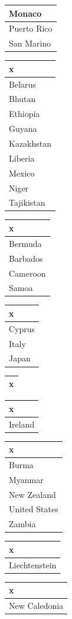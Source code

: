 \documentclass[]{article}
\begin{document}
\begin{table}
\begin{tabular}[t]{l}
\hline
Monaco\\
\hline
Puerto Rico\\
\hline
San Marino\\
\hline
\end{tabular}
\centering
\begin{tabular}[t]{l}
\hline
x\\
\hline
Belarus\\
\hline
Bhutan\\
\hline
Ethiopia\\
\hline
Guyana\\
\hline
Kazakhstan\\
\hline
Liberia\\
\hline
Mexico\\
\hline
Niger\\
\hline
Tajikistan\\
\hline
\end{tabular}
\centering
\begin{tabular}[t]{l}
\hline
x\\
\hline
Bermuda\\
\hline
Barbados\\
\hline
Cameroon\\
\hline
Samoa\\
\hline
\end{tabular}
\centering
\begin{tabular}[t]{l}
\hline
x\\
\hline
Cyprus\\
\hline
Italy\\
\hline
Japan\\
\hline
\end{tabular}
\centering
\begin{tabular}[t]{l}
\hline
x\\


\hline
\end{tabular}
\centering
\begin{tabular}[t]{l}
\hline
x\\
\hline
Ireland\\
\hline
\end{tabular}
\centering
\begin{tabular}[t]{l}
\hline
x\\
\hline
Burma\\
\hline
Myanmar\\
\hline
New Zealand\\
\hline
United States\\
\hline
Zambia\\
\hline
\end{tabular}
\centering
\begin{tabular}[t]{l}
\hline
x\\
\hline
Liechtenstein\\
\hline
\end{tabular}
\centering
\begin{tabular}[t]{l}
\hline
x\\
\hline
New Caledonia\\
\hline
\end{tabular}
\end{table}
\end{document}
